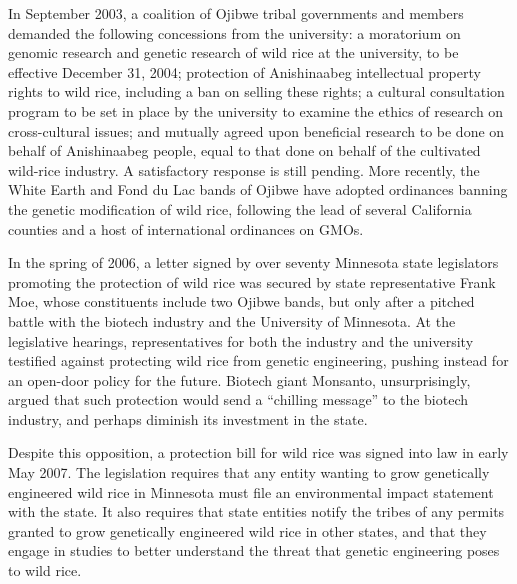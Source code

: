 In September 2003, a coalition of Ojibwe tribal governments and members
demanded the following concessions from the university: a moratorium on
genomic research and genetic research of wild rice at the university, to
be effective December 31, 2004; protection of Anishinaabeg intellectual
property rights to wild rice, including a ban on selling these rights; a
cultural consultation program to be set in place by the university to
examine the ethics of research on cross-cultural issues; and mutually
agreed upon beneficial research to be done on behalf of Anishinaabeg
people, equal to that done on behalf of the cultivated wild-rice
industry. A satisfactory response is still pending. More recently, the
White Earth and Fond du Lac bands of Ojibwe have adopted ordinances
banning the genetic modification of wild rice, following the lead of
several California counties and a host of international ordinances on
GMOs.

In the spring of 2006, a letter signed by over seventy Minnesota state
legislators promoting the protection of wild rice was secured by state
representative Frank Moe, whose constituents include two Ojibwe bands,
but only after a pitched battle with the biotech industry and the
University of Minnesota. At the legislative hearings, representatives
for both the industry and the university testified against protecting
wild rice from genetic engineering, pushing instead for an open-door
policy for the future. Biotech giant Monsanto, unsurprisingly, argued
that such protection would send a ``chilling message'' to the biotech
industry, and perhaps diminish its investment in the state.

Despite this opposition, a protection bill for wild rice was signed into
law in early May 2007. The legislation requires that any entity wanting
to grow genetically engineered wild rice in Minnesota must file an
environmental impact statement with the state. It also requires that
state entities notify the tribes of any permits granted to grow
genetically engineered wild rice in other states, and that they engage
in studies to better understand the threat that genetic engineering
poses to wild rice.

